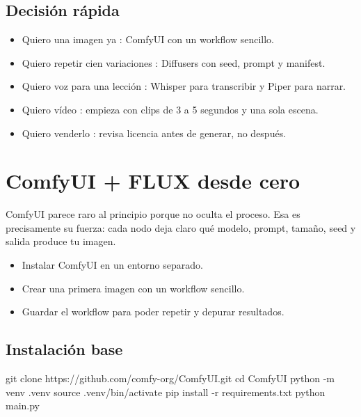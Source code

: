\documentclass[11pt,a4paper]{book}
\begin{document}
\section{Decisión rápida}
\begin{itemize}\item Quiero una imagen ya : ComfyUI con un workflow sencillo.\end{itemize}
\begin{itemize}\item Quiero repetir cien variaciones : Diffusers con seed, prompt y manifest.\end{itemize}
\begin{itemize}\item Quiero voz para una lección : Whisper para transcribir y Piper para narrar.\end{itemize}
\begin{itemize}\item Quiero vídeo : empieza con clips de 3 a 5 segundos y una sola escena.\end{itemize}
\begin{itemize}\item Quiero venderlo : revisa licencia antes de generar, no después.\end{itemize}
\chapter{ComfyUI + FLUX desde cero}
ComfyUI parece raro al principio porque no oculta el proceso. Esa es precisamente su fuerza: cada nodo deja claro qué modelo, prompt, tamaño, seed y salida produce tu imagen.

\begin{itemize}\item Instalar ComfyUI en un entorno separado.\end{itemize}
\begin{itemize}\item Crear una primera imagen con un workflow sencillo.\end{itemize}
\begin{itemize}\item Guardar el workflow para poder repetir y depurar resultados.\end{itemize}
\section{Instalación base}
\begin{codebox}
git clone https://github.com/comfy-org/ComfyUI.git
cd ComfyUI
python -m venv .venv
source .venv/bin/activate
pip install -r requirements.txt
python main.py
\end{codebox}
\end{document}
